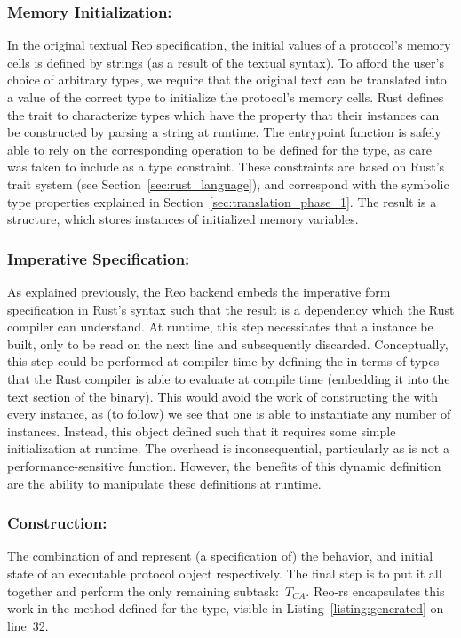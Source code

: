 \subsubsection{Memory Initialization: }



In the original textual Reo specification, the initial values of a protocol's memory cells is defined by strings (as a result of the textual syntax). To afford the user's choice of arbitrary types, we require that the original text can be translated into a value of the correct type to initialize the protocol's memory cells. Rust defines the  trait to characterize types which have the property that their instances can be constructed by parsing a string at runtime. The entrypoint function is safely able to rely on the corresponding  operation to be defined for the type, as care was taken to include  as a type constraint. These constraints are based on Rust's trait system (see Section~\ref{sec:rust_language}), and correspond with the symbolic type properties explained in Section~\ref{sec:translation_phase_1}. The result is a  structure, which stores instances of initialized memory variables.

\subsubsection{Imperative Specification: }
As explained previously, the Reo backend embeds the imperative form specification in Rust's syntax such that the result is a dependency which the Rust compiler can understand. At runtime, this step necessitates that a  instance be built, only to be read on the next line and subsequently discarded. Conceptually, this step could be performed at compiler-time by defining the  in terms of types that the Rust compiler is able to evaluate at compile time (embedding it into the text section of the binary). This would avoid the work of constructing the  with every instance, as (to follow) we see that one  is able to instantiate any number of  instances. Instead, this object defined such that it requires some simple initialization at runtime. The overhead is inconsequential, particularly as  is not a performance-sensitive function. However, the benefits of this dynamic definition are the ability to manipulate these definitions at runtime. 

\subsubsection{Construction: }
The combination of  and  represent (a specification of) the behavior, and initial state of an executable protocol object respectively. The final step is to put it all together and perform the only remaining subtask:~$T_{CA}$. Reo-rs encapsulates this work in the  method defined for the  type, visible in Listing~\ref{listing:generated} on line~32. 

